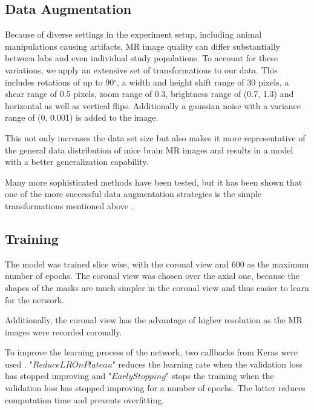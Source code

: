 \subsection{Data Augmentation} \label{Data Augmentation}

Because of diverse settings in the experiment setup, including animal manipulations causing artifacts, MR image quality can differ substantially between labs and even individual study populations.
To account for these variations, we apply an extensive set of transformations to our data.
This includes rotations of up to 90$^{\circ}$, a width and height shift range of 30 pixels, a shear range of 0.5 pixels, zoom range of 0.3, brightness range of (0.7, 1.3) and horizontal as well as vertical flips.
Additionally a gaussian noise with a variance range of (0, 0.001) is added to the image.

This not only increases the data set size but also makes it more representative of the general data distribution of mice brain MR images and results in a model with a better generalization capability.

Many more sophisticated methods have been tested, but it has been shown that one of the more successful data augmentation strategies is the simple transformations mentioned above \cite{perez_effectiveness_2017}.


\subsection{Training}
The model was trained slice wise, with the coronal view and 600 as the maximum number of epochs.
The coronal view was chosen over the axial one, because the shapes of the masks are much simpler in the coronal view and thus easier to learn for the network.

Additionally, the coronal view has the advantage of higher resolution as the MR images were recorded coronally.

To improve the learning process of the network, two callbacks from Keras were used \cite{noauthor_callbacks_nodate}.
"\textcolor{mg}{\texttt{$ReduceLROnPlateau$}}" reduces the learning rate when the validation loss has stopped improving and "\textcolor{mg}{\texttt{$EarlyStopping$}}" stops the training when the validation loss has stopped improving for a number of epochs.
The latter reduces computation time and prevents overfitting.

